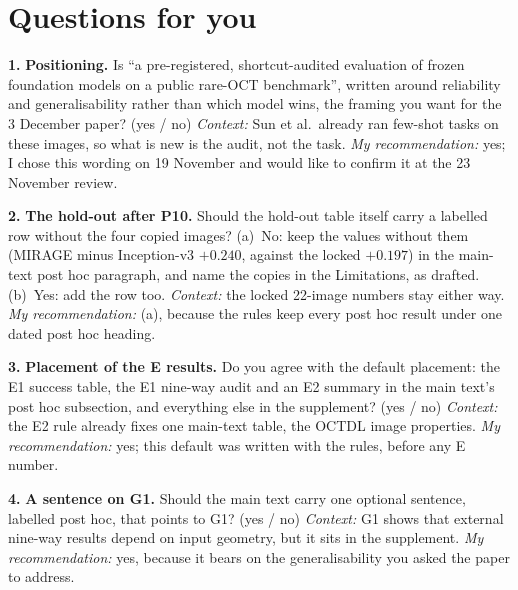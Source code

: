 \documentclass[10pt,a4paper]{article}
\newcommand{\ask}[2]{\par\smallskip\noindent\textcolor{accent}{\textbf{#1.}} #2\par}
\begin{document}
\section{Questions for you}

\ask{1}{\textbf{Positioning.} Is ``a pre-registered, shortcut-audited evaluation of frozen foundation models on a
public rare-OCT benchmark'', written around reliability and generalisability rather than which model wins, the
framing you want for the 3 December paper? (yes / no) \emph{Context:} Sun et al.\ already ran few-shot tasks on
these images, so what is new is the audit, not the task. \emph{My recommendation:} yes; I chose this wording on
19 November and would like to confirm it at the 23 November review.}

\ask{2}{\textbf{The hold-out after P10.} Should the hold-out table itself carry a labelled row without the four
copied images? (a)~No: keep the values without them (MIRAGE minus Inception-v3 $+0.240$, against the locked
$+0.197$) in the main-text post hoc paragraph, and name the copies in the Limitations, as drafted. (b)~Yes: add
the row too. \emph{Context:} the locked 22-image numbers stay either way. \emph{My recommendation:} (a), because
the rules keep every post hoc result under one dated post hoc heading.}

\ask{3}{\textbf{Placement of the E results.} Do you agree with the default placement: the E1 success table, the E1
nine-way audit and an E2 summary in the main text's post hoc subsection, and everything else in the supplement?
(yes / no) \emph{Context:} the E2 rule already fixes one main-text table, the OCTDL image properties.
\emph{My recommendation:} yes; this default was written with the rules, before any E number.}

\ask{4}{\textbf{A sentence on G1.} Should the main text carry one optional sentence, labelled post hoc, that points
to G1? (yes / no) \emph{Context:} G1 shows that external nine-way results depend on input geometry, but it sits in
the supplement. \emph{My recommendation:} yes, because it bears on the generalisability you asked the paper to
address.}
\end{document}
